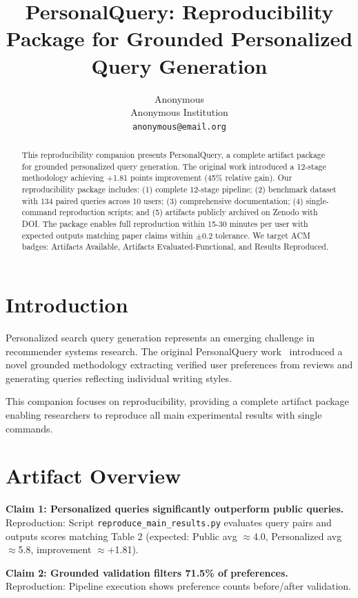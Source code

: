 \documentclass[11pt]{article}
\title{\textbf{PersonalQuery: Reproducibility Package for Grounded Personalized Query Generation}}
\author{Anonymous\\
Anonymous Institution\\
\texttt{anonymous@email.org}}
\begin{document}
\maketitle

\begin{abstract}
This reproducibility companion presents PersonalQuery, a complete artifact package for grounded personalized query generation. The original work introduced a 12-stage methodology achieving +1.81 points improvement (45\% relative gain). Our reproducibility package includes: (1) complete 12-stage pipeline; (2) benchmark dataset with 134 paired queries across 10 users; (3) comprehensive documentation; (4) single-command reproduction scripts; and (5) artifacts publicly archived on Zenodo with DOI. The package enables full reproduction within 15-30 minutes per user with expected outputs matching paper claims within $\pm$0.2 tolerance. We target ACM badges: Artifacts Available, Artifacts Evaluated-Functional, and Results Reproduced.
\end{abstract}

\section{Introduction}

Personalized search query generation represents an emerging challenge in recommender systems research. The original PersonalQuery work~\citep{personalquery2026} introduced a novel grounded methodology extracting verified user preferences from reviews and generating queries reflecting individual writing styles.

This companion focuses on reproducibility, providing a complete artifact package enabling researchers to reproduce all main experimental results with single commands.

\section{Artifact Overview}

\textbf{Claim 1: Personalized queries significantly outperform public queries.}\\
Reproduction: Script \texttt{reproduce\_main\_results.py} evaluates query pairs and outputs scores matching Table 2 (expected: Public avg $\approx$4.0, Personalized avg $\approx$5.8, improvement $\approx$+1.81).

\textbf{Claim 2: Grounded validation filters 71.5\% of preferences.}\\
Reproduction: Pipeline execution shows preference counts before/after validation.
\end{document}
